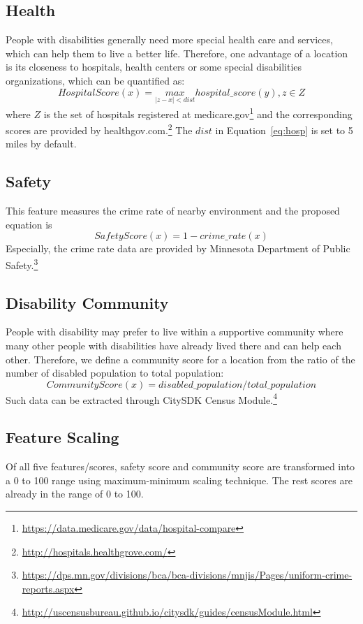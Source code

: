 \documentclass[10pt]{article}
\begin{document}
\subsection{Health}
People with disabilities generally need more special health care and services, which can help them to live a better life. Therefore, one advantage of a location is its closeness to hospitals, health centers or some special disabilities organizations, which can be quantified as:
\begin{equation}
HospitalScore(x) = \underset{|z-x|<dist}{max}hospital\_score(y), z\in Z
\label{eq:hosp}
\end{equation}
 where $Z$ is the set of hospitals registered at medicare.gov\footnote{\url{https://data.medicare.gov/data/hospital-compare}} and the corresponding scores are provided by healthgov.com.\footnote{\url{http://hospitals.healthgrove.com/}} The $dist$ in Equation~\ref{eq:hosp} is set to 5 miles by default.
 
\subsection{Safety}
This feature measures the crime rate of nearby environment and the proposed equation is
\begin{equation}
SafetyScore(x) = 1 - crime\_rate(x)
\end{equation}
Especially, the crime rate data are provided by Minnesota Department of Public Safety.\footnote{\url{https://dps.mn.gov/divisions/bca/bca-divisions/mnjis/Pages/uniform-crime-reports.aspx}} 

\subsection{Disability Community}
People with disability may prefer to live within a supportive community where many other people with disabilities have already lived there and can help each other. Therefore, we define a community score for a location from the ratio of the number of disabled population to total population:
\begin{equation}
CommunityScore(x) = disabled\_population/total\_population
\end{equation}
 Such data can be extracted through CitySDK Census Module.\footnote{\url{http://uscensusbureau.github.io/citysdk/guides/censusModule.html}}
 
 \subsection{Feature Scaling}
Of all five features/scores, safety score and community score are transformed into a 0 to 100 range using maximum-minimum scaling technique. The rest scores are already in the range of 0 to 100.
 
\end{document}
